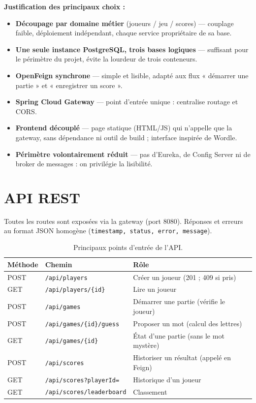 \documentclass[11pt,a4paper]{article}
\begin{document}
\textbf{Justification des principaux choix :}
\begin{itemize}[leftmargin=1.2em, itemsep=1pt, topsep=2pt]
  \item \textbf{Découpage par domaine métier} (joueurs / jeu / scores) — couplage faible,
        déploiement indépendant, chaque service propriétaire de sa base.
  \item \textbf{Une seule instance PostgreSQL, trois bases logiques} — suffisant pour le
        périmètre du projet, évite la lourdeur de trois conteneurs.
  \item \textbf{OpenFeign synchrone} — simple et lisible, adapté aux flux « démarrer une
        partie » et « enregistrer un score ».
  \item \textbf{Spring Cloud Gateway} — point d'entrée unique : centralise routage et CORS.
  \item \textbf{Frontend découplé} — page statique (HTML/JS) qui n'appelle que la gateway,
        sans dépendance ni outil de build ; interface inspirée de Wordle.
  \item \textbf{Périmètre volontairement réduit} — pas d'Eureka, de Config Server ni de
        broker de messages : on privilégie la lisibilité.
\end{itemize}

\section{API REST}
Toutes les routes sont exposées via la gateway (port 8080). Réponses et erreurs au
format JSON homogène (\texttt{timestamp, status, error, message}).

\begin{table}[h]
\centering
\small
\begin{tabular}{@{}lll@{}}
\toprule
\textbf{Méthode} & \textbf{Chemin} & \textbf{Rôle} \\
\midrule
POST & \texttt{/api/players}            & Créer un joueur (201 ; 409 si pris) \\
GET  & \texttt{/api/players/\{id\}}     & Lire un joueur \\
POST & \texttt{/api/games}              & Démarrer une partie (vérifie le joueur) \\
POST & \texttt{/api/games/\{id\}/guess} & Proposer un mot (calcul des lettres) \\
GET  & \texttt{/api/games/\{id\}}       & État d'une partie (sans le mot mystère) \\
POST & \texttt{/api/scores}             & Historiser un résultat (appelé en Feign) \\
GET  & \texttt{/api/scores?playerId=}   & Historique d'un joueur \\
GET  & \texttt{/api/scores/leaderboard} & Classement \\
\bottomrule
\end{tabular}
\caption{Principaux points d'entrée de l'API.}
\end{table}
\end{document}
